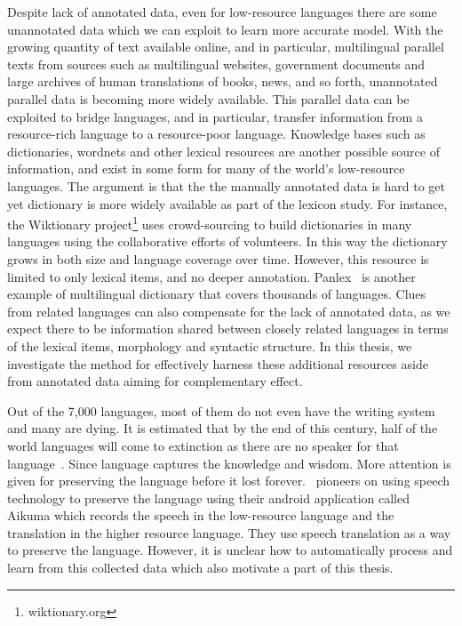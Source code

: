 \documentclass[12pt,twoside,final,hidelinks]{ltthesis}
\theoremstyle{definition}
\begin{document}
Despite lack of annotated data, even for low-resource languages there are some unannotated data which we can exploit to learn more accurate model. With the growing quantity of text available online, and in particular, multilingual parallel texts from sources such as multilingual websites, government documents and large archives of human translations of books, news, and so forth, unannotated parallel data is becoming more widely available. This parallel data can be exploited to bridge languages, and in particular, transfer information from a resource-rich language to a resource-poor language. Knowledge bases such as dictionaries, wordnets and other lexical resources are another possible source of information, and exist in some form for many of the world's low-resource languages. The argument is that the the manually annotated data is hard to get yet dictionary is more widely available as part of the lexicon study. For instance, the Wiktionary project\footnote{wiktionary.org} uses crowd-sourcing to build dictionaries in many languages using the collaborative efforts of volunteers. In this way the dictionary grows in both size and language coverage over time. However, this resource is limited to only lexical items, and no deeper annotation. Panlex~\cite{Kamholz14} is another example of multilingual dictionary that covers thousands of languages. Clues from related languages can also compensate for the lack of annotated data, as we expect there to be information shared between closely related languages in terms of the lexical items, morphology and syntactic structure. In this thesis, we investigate the method for effectively harness these additional resources aside from annotated data aiming for complementary effect. 

% 
Out of the 7,000 languages, most of them do not even have the writing system and many are dying. It is estimated that by the end of this century, half of the world languages will come to extinction as there are no speaker for that language~\cite{crystal2002language}. Since language captures the knowledge and wisdom. More attention is given for preserving the language before it lost forever.~ pioneers on using speech technology to preserve the language using their android application called Aikuma which records the speech in the low-resource language and the translation in the higher resource language. They use speech translation as a way to preserve the language. However, it is unclear how to automatically process and learn from this collected data which also motivate a part of this thesis. 
\end{document}
